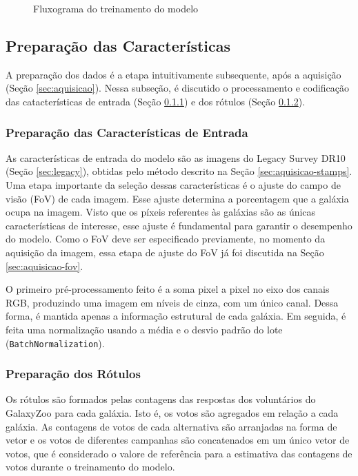 \begin{figure}[!ht]
  \centering
  \caption{Fluxograma do treinamento do modelo}
  \label{fig:flow-modelo}
\end{figure}


\subsection{Preparação das Características}
\label{sec:modelo-prep}
A preparação dos dados é a etapa intuitivamente subsequente, após a aquisição (Seção \ref{sec:aquisicao}). Nessa subseção, é discutido o processamento e codificação das catacterísticas de entrada (Seção \ref{sec:modelo-prep-input}) e dos rótulos (Seção \ref{sec:modelo-prep-labels}).


\subsubsection{Preparação das Características de Entrada}
\label{sec:modelo-prep-input}
As características de entrada do modelo são as imagens do Legacy Survey DR10 (Seção \ref{sec:legacy}), obtidas pelo método descrito na Seção \ref{sec:aquisicao-stamps}. Uma etapa importante da seleção dessas características é o ajuste do campo de visão (FoV) de cada imagem. Esse ajuste determina a porcentagem que a galáxia ocupa na imagem. Visto que os píxeis referentes às galáxias são as únicas características de interesse, esse ajuste é fundamental para garantir o desempenho do modelo. Como o FoV deve ser especificado previamente, no momento da aquisição da imagem, essa etapa de ajuste do FoV já foi discutida na Seção \ref{sec:aquisicao-fov}.

O primeiro pré-processamento feito é a soma pixel a pixel no eixo dos canais RGB, produzindo uma imagem em níveis de cinza, com um único canal. Dessa forma, é mantida apenas a informação estrutural de cada galáxia. Em seguida, é feita uma normalização usando a média e o desvio padrão do lote (\texttt{BatchNormalization}).


\subsubsection{Preparação dos Rótulos}
\label{sec:modelo-prep-labels}
Os rótulos são formados pelas contagens das respostas dos voluntários do GalaxyZoo para cada galáxia. Isto é, os votos são agregados em relação a cada galáxia. As contagens de votos de cada alternativa são arranjadas na forma de vetor e os votos de diferentes campanhas são concatenados em um único vetor de votos, que é considerado o valore de referência para a estimativa das contagens de votos durante o treinamento do modelo.





